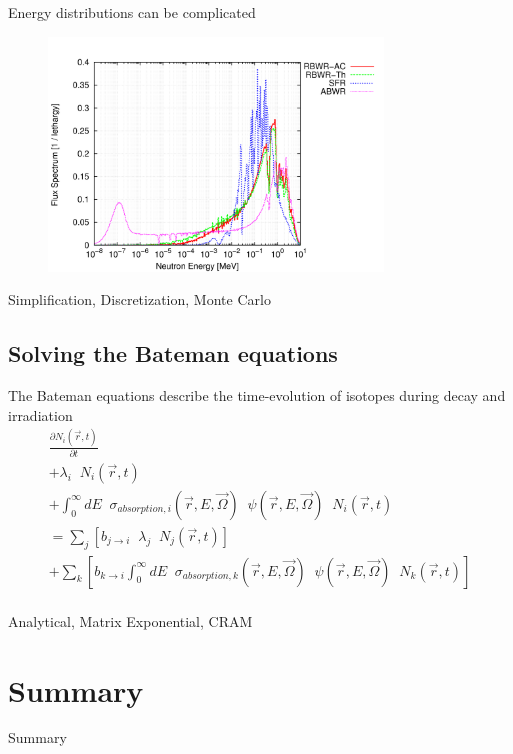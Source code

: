 \documentclass{beamer}
\begin{document}
    \begin{frame}{Energy distributions can be complicated}
        \begin{figure}
            \centering
            \includegraphics[width=24em]{./img/energyFlux.png}
            \caption*{}
        \end{figure}
    \end{frame}

    \begin{frame}{Simplification, Discretization, Monte Carlo}
    \end{frame}

\subsection{Solving the Bateman equations}

    \begin{frame}{The Bateman equations describe the time-evolution of isotopes during decay and irradiation}
        \begin{equation*}
            \begin{split}
                \frac{\partial N_i(\vec r, t)}{\partial t} \\
                + \lambda_i \; \; N_i(\vec r, t) \\
                + \int_0^\infty \! \! \! \! dE \; \; \sigma_{absorption,i} ( \vec r, E, \vec\Omega) \; \; \psi(\vec r, E, \vec \Omega) \; \; N_i(\vec r, t) \\
                = \sum_j \left[ b_{j \rightarrow i} \; \; \lambda_j \; \; N_j(\vec r, t) \right] \\
                + \sum_k \left[ b_{k \rightarrow i} \int_0^\infty \! \! \! \! dE \; \; \sigma_{absorption,k} ( \vec r, E, \vec\Omega) \; \; \psi(\vec r, E, \vec \Omega) \; \; N_k(\vec r, t) \right] \\
            \end{split}
        \end{equation*}
    \end{frame}

    \begin{frame}{Analytical, Matrix Exponential, CRAM}
    \end{frame}

\section*{Summary}

    \begin{frame}{Summary}
    \end{frame}
\end{document}
